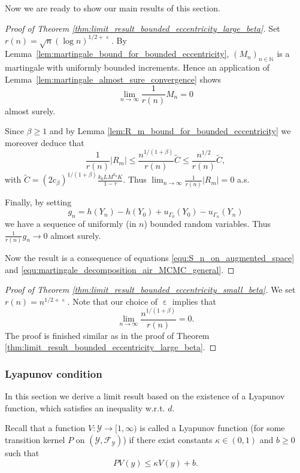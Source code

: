 \documentclass[12pt]{article}
\theoremstyle{definition}
\newcommand{\N}{\mathbb{N}}
\newcommand{\cY}{\mathcal{Y}}
\DeclareMathOperator{\eps}{\varepsilon}
\begin{document}
Now we are ready to show our main results of this section. 
\begin{proof}[Proof of Theorem \ref{thm:limit_result_bounded_eccentricity_large_beta}]
	Set $r(n ) = \sqrt{n}(\log n)^{1/2+\eps}$.
	By Lemma~\ref{lem:martingale_bound_for_bounded_eccentricity}, $(M_n)_{n \in \N}$ is a martingale with uniformly bounded increments. 
	Hence an application of Lemma~\ref{lem:martingale_almost_sure_convergence} shows 
	\[
	\lim_{n \to \infty}\frac{1}{r(n)} M_n =0
	\]
	almost surely.
	
	\medskip
	Since $\beta\geq 1$ and by Lemma \ref{lem:R_m_bound_for_bounded_eccentricity} we moreover deduce that 
	\[
	\frac{1}{r(n) } \vert R_m \vert \leq \frac{n^{1/(1+\beta)}}{r(n)} \widetilde{C} \leq \frac{n^{1/2}}{r(n)} \widetilde{C}, 
	\]
	with $\widetilde{C} = (2c_\beta)^{1/(1+\beta)}\frac{k_0L M^{k_0} K}{1- \tau}$. 
	Thus $\lim_{n \to \infty} \frac{1}{r(n) }\vert R_m \vert = 0$ a.s.
	
	Finally, by setting 
	\[
	g_n = h(Y_n) - h(Y_0) 
	+{u}_{\Gamma_0}(Y_0) - {u}_{\Gamma_{n}}(Y_n)
	\] 
	we have a sequence of uniformly (in $n$) bounded random variables. 
	Thus $\frac{1}{r(n)} g_n \to 0$ almost surely. 
	
	Now the result is a consequence of equations \eqref{equ:S_n_on_augmented_space} and  \eqref{equ:martingale_decomposition_air_MCMC_general}.
\end{proof}

\begin{proof}[Proof of Theorem \ref{thm:limit_result_bounded_eccentricity_small_beta}]
	We set $r(n) = n^{1/2+\eps}$.
	Note that our choice of $\eps$ implies that 
	\[
	\lim_{n \to \infty}\frac{n^{1/(1+\beta)}}{r(n)} =0.
	\]
	The proof is finished similar as in the proof of Theorem \ref{thm:limit_result_bounded_eccentricity_large_beta}. 
\end{proof}



\subsubsection{Lyapunov condition}
In this section we derive a limit result based on the existence of a Lyapunov function, which satisfies an inequality w.r.t. $d$.

Recall that a function $V \colon \cY \to [1, \infty)$ is called a Lyapunov function (for some transition kernel $P$ on $(\cY, \mathcal{F}_\cY)$) if there exist constants $\kappa \in (0,1)$ and $b \geq0$ such that 
\[
PV(y) \leq \kappa V(y)+b.
\]
\end{document}

